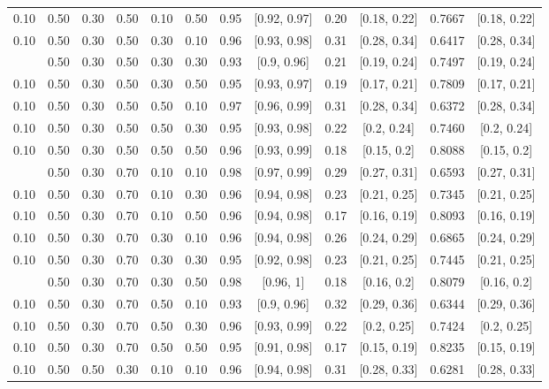 \documentclass[
  11pt,
]{article}
\begin{document}
\begin{landscape}
\begin{ThreePartTable}
\begin{longtable}[t]{cccccccccccc}
0.10 & 0.50 & 0.30 & 0.50 & 0.10 & 0.50 & 0.95 & {}[0.92, 0.97] & 0.20 & {}[0.18, 0.22] & 0.7667 & {}[0.18, 0.22]\\
0.10 & 0.50 & 0.30 & 0.50 & 0.30 & 0.10 & 0.96 & {}[0.93, 0.98] & 0.31 & {}[0.28, 0.34] & 0.6417 & {}[0.28, 0.34]\\
\addlinespace
0.10 & 0.50 & 0.30 & 0.50 & 0.30 & 0.30 & 0.93 & {}[0.9, 0.96] & 0.21 & {}[0.19, 0.24] & 0.7497 & {}[0.19, 0.24]\\
0.10 & 0.50 & 0.30 & 0.50 & 0.30 & 0.50 & 0.95 & {}[0.93, 0.97] & 0.19 & {}[0.17, 0.21] & 0.7809 & {}[0.17, 0.21]\\
0.10 & 0.50 & 0.30 & 0.50 & 0.50 & 0.10 & 0.97 & {}[0.96, 0.99] & 0.31 & {}[0.28, 0.34] & 0.6372 & {}[0.28, 0.34]\\
0.10 & 0.50 & 0.30 & 0.50 & 0.50 & 0.30 & 0.95 & {}[0.93, 0.98] & 0.22 & {}[0.2, 0.24] & 0.7460 & {}[0.2, 0.24]\\
0.10 & 0.50 & 0.30 & 0.50 & 0.50 & 0.50 & 0.96 & {}[0.93, 0.99] & 0.18 & {}[0.15, 0.2] & 0.8088 & {}[0.15, 0.2]\\
\addlinespace
0.10 & 0.50 & 0.30 & 0.70 & 0.10 & 0.10 & 0.98 & {}[0.97, 0.99] & 0.29 & {}[0.27, 0.31] & 0.6593 & {}[0.27, 0.31]\\
0.10 & 0.50 & 0.30 & 0.70 & 0.10 & 0.30 & 0.96 & {}[0.94, 0.98] & 0.23 & {}[0.21, 0.25] & 0.7345 & {}[0.21, 0.25]\\
0.10 & 0.50 & 0.30 & 0.70 & 0.10 & 0.50 & 0.96 & {}[0.94, 0.98] & 0.17 & {}[0.16, 0.19] & 0.8093 & {}[0.16, 0.19]\\
0.10 & 0.50 & 0.30 & 0.70 & 0.30 & 0.10 & 0.96 & {}[0.94, 0.98] & 0.26 & {}[0.24, 0.29] & 0.6865 & {}[0.24, 0.29]\\
0.10 & 0.50 & 0.30 & 0.70 & 0.30 & 0.30 & 0.95 & {}[0.92, 0.98] & 0.23 & {}[0.21, 0.25] & 0.7445 & {}[0.21, 0.25]\\
\addlinespace
0.10 & 0.50 & 0.30 & 0.70 & 0.30 & 0.50 & 0.98 & {}[0.96, 1] & 0.18 & {}[0.16, 0.2] & 0.8079 & {}[0.16, 0.2]\\
0.10 & 0.50 & 0.30 & 0.70 & 0.50 & 0.10 & 0.93 & {}[0.9, 0.96] & 0.32 & {}[0.29, 0.36] & 0.6344 & {}[0.29, 0.36]\\
0.10 & 0.50 & 0.30 & 0.70 & 0.50 & 0.30 & 0.96 & {}[0.93, 0.99] & 0.22 & {}[0.2, 0.25] & 0.7424 & {}[0.2, 0.25]\\
0.10 & 0.50 & 0.30 & 0.70 & 0.50 & 0.50 & 0.95 & {}[0.91, 0.98] & 0.17 & {}[0.15, 0.19] & 0.8235 & {}[0.15, 0.19]\\
0.10 & 0.50 & 0.50 & 0.30 & 0.10 & 0.10 & 0.96 & {}[0.94, 0.98] & 0.31 & {}[0.28, 0.33] & 0.6281 & {}[0.28, 0.33]\\

\end{longtable}
\end{ThreePartTable}
\end{landscape}
\end{document}

